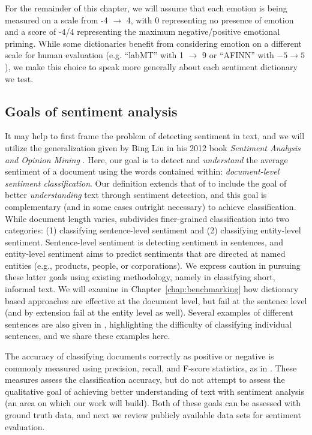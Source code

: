 For the remainder of this chapter, we will assume that each emotion is being measured on a scale from -4 $\rightarrow$ 4, with 0 representing no presence of emotion and a score of -4/4 representing the maximum negative/positive emotional priming.
While some dictionaries benefit from considering emotion on a different scale for human evaluation (e.g. ``labMT'' with 1 $\rightarrow$ 9 or ``AFINN'' with $-5\to5$), we make this choice to speak more generally about each sentiment dictionary we test.

\clearpage

\subsection{Goals of sentiment analysis}

It may help to first frame the problem of detecting sentiment in text, and we will utilize the generalization given by Bing Liu in his 2012 book \textit{Sentiment Analysis and Opinion Mining} \citep{liu2012sentiment}.
Here, our goal is to detect and \textit{understand} the average sentiment of a document using the words contained within: \textit{document-level sentiment classification}.
Our definition extends that of \cite{liu2012sentiment} to include the goal of better \textit{understanding} text through sentiment detection, and this goal is complementary (and in some cases outright necessary) to achieve classification.
While document length varies, \cite{liu2012sentiment} subdivides finer-grained classification into two categories: (1) classifying sentence-level sentiment and (2) classifying entity-level sentiment.
Sentence-level sentiment is detecting sentiment in sentences, and entity-level sentiment aims to predict sentiments that are directed at named entities (e.g., products, people, or corporations).
We express caution in pursuing these latter goals using existing methodology, namely in classifying short, informal text.
We will examine in Chapter~\ref{chap:benchmarking} how dictionary based approaches are effective at the document level, but fail at the sentence level (and by extension fail at the entity level as well).
Several examples of different sentences are also given in \cite{liu2012sentiment}, highlighting the difficulty of classifying individual sentences, and we share these examples here.

The accuracy of classifying documents correctly as positive or negative is commonly measured using precision, recall, and F-score statistics, as in \cite{ribeiro2016sentibench}.
These measures assess the classification accuracy, but do not attempt to assess the qualitative goal of achieving better understanding of text with sentiment analysis (an area on which our work will build).
Both of these goals can be assessed with ground truth data, and next we review publicly available data sets for sentiment evaluation.

